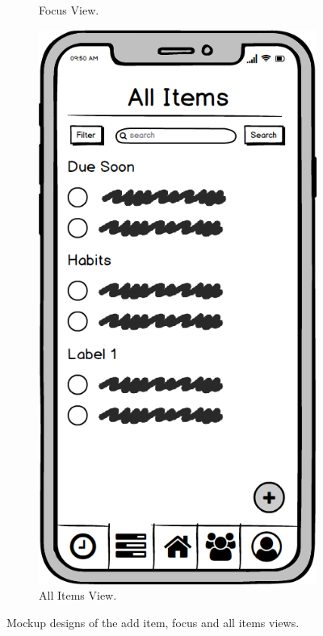 \begin{figure}
\begin{subfigure}[b]{0.3\textwidth}
        \caption{Focus View.}
        \label{fig:focus}
    \end{subfigure}
    \hfill
    \begin{subfigure}[b]{0.3\textwidth}
        \centering
        \includegraphics[width=\textwidth]{./graphics/design/All Items.png}
        \caption{All Items View.}
        \label{fig:all_items}
    \end{subfigure}
    
    \caption{Mockup designs of the add item, focus and all items views.}
    \label{fig:additem_focus_allitems}
\end{figure}

